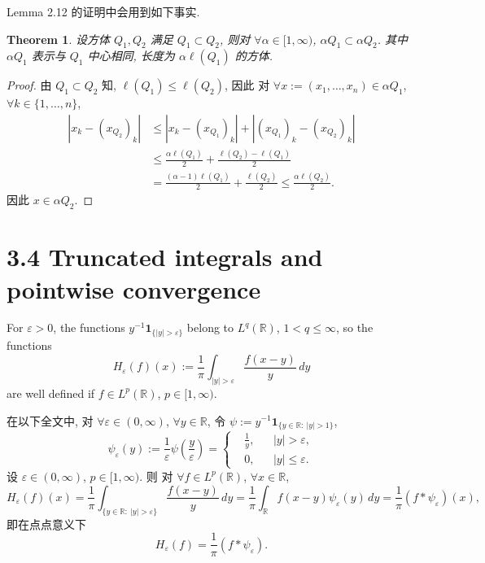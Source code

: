 \documentclass[a4paper,11pt]{article}
\newtheorem{theorem}{Theorem}[section]
\theoremstyle{definition}
\begin{document}
Lemma 2.12 的证明中会用到如下事实.

\begin{theorem}
    设方体 $ Q_1, Q_2 $ 满足 $ Q_1 \subset Q_2 $, 
    则对 $ \forall \alpha \in [1, \infty) $, 
    $ \alpha Q_1 \subset \alpha Q_2 $. 其中 $ \alpha Q_1 $ 表示与 $ Q_1 $ 中心相同, 长度为 $ \alpha \ell(Q_1) $ 的方体.
\end{theorem}

\begin{proof}
    由 $ Q_1 \subset Q_2 $ 知, $ \ell(Q_1) \leq \ell(Q_2) $, 因此
    对 $ \forall x := (x_1, \ldots, x_n) \in \alpha Q_1 $, $ \forall k \in \{1, \ldots, n\} $,
    \begin{align*}
        |x_k - (x_{Q_2})_k| 
            &\leq |x_k - (x_{Q_1})_k| + |(x_{Q_1})_k - (x_{Q_2})_k| \\
            &\leq \frac{\alpha \ell(Q_1)}{2} + \frac{\ell(Q_2) - \ell(Q_1)}{2} \\
            &= \frac{(\alpha - 1) \ell(Q_1)}{2} + \frac{\ell(Q_2)}{2}
            \leq \frac{\alpha \ell(Q_2)}{2}.
    \end{align*}
    因此 $ x \in \alpha Q_2 $.
\end{proof}

\section*{3.4 Truncated integrals and pointwise convergence}

\begin{framed}
    For $ \varepsilon > 0 $, the functions $ y^{-1} \mathbf{1}_{\{|y| > \varepsilon\}} $  
    belong to $ L^q(\mathbb{R}) $, $ 1 < q \leq \infty $, so the functions
    $$
        H_\varepsilon (f) (x) 
            := \frac{1}{\pi} \int_{|y| > \varepsilon} \frac{f(x - y)}{y} \, dy 
    $$
    are well defined if $ f \in L^p(\mathbb{R}) $, $ p \in [1, \infty) $.
\end{framed}

在以下全文中, 对 $ \forall \varepsilon \in (0, \infty) $, $ \forall y \in \mathbb{R} $, 令
$ \psi := y^{-1} \mathbf{1}_{\{y \in \mathbb{R} :\ |y| > 1\}} $, 
$$
    \psi_\varepsilon(y) := \frac{1}{\varepsilon} \psi \left( \frac{y}{\varepsilon} \right) 
        = \left\{ \begin{aligned}
        &\frac{1}{y}, && |y| > \varepsilon, \\
        &0,           && |y| \leq \varepsilon.
    \end{aligned} \right.
$$
设 $ \varepsilon \in (0, \infty) $, $ p \in [1, \infty) $. 则
对 $ \forall f \in L^p(\mathbb{R}) $, $ \forall x \in \mathbb{R} $,
$$
    H_\varepsilon (f) (x) 
        = \frac{1}{\pi} \int_{\{y \in \mathbb{R}:\ |y| > \varepsilon\}} \frac{f(x - y)}{y} \, dy  
        = \frac{1}{\pi} \int_\mathbb{R} f(x - y) \psi_\varepsilon(y) \, dy 
        = \frac{1}{\pi} (f * \psi_\varepsilon)(x),
$$
即在点点意义下
$$
    H_\varepsilon (f) = \frac{1}{\pi} (f * \psi_\varepsilon).
$$
\end{document}
